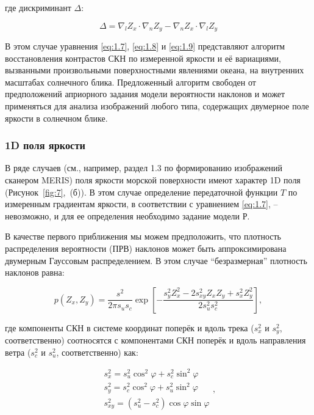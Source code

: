\noindent где дискриминант $\Delta $:


\begin{equation} \label{eq:1.10)} 
\Delta =\nabla _{l} Z_{x} \cdot \nabla _{n} Z_{y}^{} -\nabla _{n} Z_{x} \cdot \nabla _{l} Z_{y}^{}  
\end{equation} 


В этом случае уравнения \eqref{eq:1.7}, \eqref{eq:1.8} и \eqref{eq:1.9} представляют алгоритм восстановления контрастов СКН по измеренной яркости и её вариациями, вызванными произвольными поверхностными явлениями океана, на внутренних масштабах солнечного блика. Предложенный алгоритм свободен от предположений априорного задания модели вероятности наклонов и может применяться для анализа изображений любого типа, содержащих двумерное поле яркости в солнечном блике.



\subsubsection{1D поля яркости}

В ряде случаев (см., например, раздел 1.3 по формированию изображений сканером MERIS) поля яркости морской поверхности имеют характер 1D поля (Рисунок~\ref{fig:7},~(б)). В этом случае определение передаточной функции $T$ по измеренным градиентам яркости, в соответствии с уравнением \eqref{eq:1.7}, -- невозможно, и для ее определения необходимо задание модели Р.

В качестве первого приближения мы можем предположить, что плотность распределения вероятности (ПРВ) наклонов может быть аппроксимирована двумерным Гауссовым распределением. В этом случае ``безразмерная'' плотность наклонов равна:


\begin{equation} \label{eq:1.11} 
p(Z_{x} ,Z_{y} )=\frac{s^{2} }{2\pi s{}_{u} s{}_{c} } \exp \left[-\frac{s_{y}^{2} Z_{x}^{2} -2s_{xy}^{2} Z_{x}^{} Z_{y}^{} +s_{x}^{2} Z_{y}^{2} }{2s_{u}^{2} s_{c}^{2} } \right],  
\end{equation} 


\noindent где компоненты СКН в системе координат поперёк и вдоль трека ($s_{x}^{2} $ и $s_{y}^{2} $, соответственно) соотносятся с компонентами СКН поперёк и вдоль направления ветра ($s_{c}^{2} $ и $s_{u}^{2} $, соответственно) как:


\begin{equation} \label{eq:1.12} 
\begin{array}{l} {s_{x}^{2} =s_{u}^{2} \cos ^{2} \varphi +s_{c}^{2} \sin ^{2} \varphi } \\ {s_{y}^{2} =s_{c}^{2} \cos ^{2} \varphi +s_{u}^{2} \sin ^{2} \varphi } \\ {s_{xy}^{2} =(s_{u}^{2} -s_{c}^{2} )\cos \varphi \sin \varphi } \end{array},  
\end{equation} 



